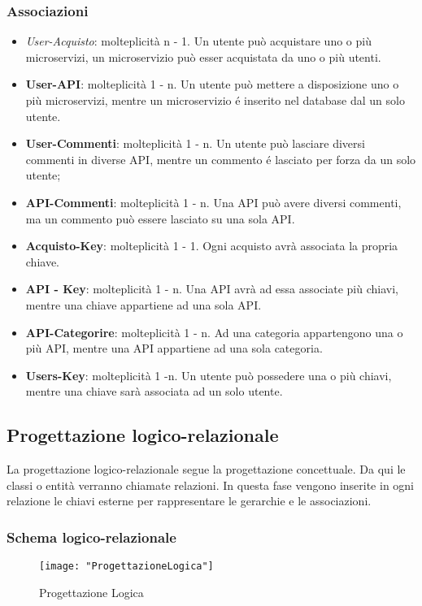 {{		\subsubsection{Associazioni}
		\begin{itemize}
			\item\textit{User-Acquisto}: molteplicità n - 1. Un utente può acquistare uno o più microservizi, un microservizio può esser acquistata da uno o più utenti.
			\item\textbf{User-API}: molteplicità 1 - n. Un utente può mettere a disposizione uno o più microservizi, mentre un microservizio é inserito nel database dal un solo utente.
			\item\textbf{User-Commenti}: molteplicità 1 - n. Un utente può lasciare diversi commenti in diverse API, mentre un commento é lasciato per forza da un solo utente;
			\item\textbf{API-Commenti}: molteplicità 1 - n. Una API può avere diversi commenti, ma un commento può essere lasciato su una sola API.	
			\item\textbf{Acquisto-Key}: molteplicità 1 - 1. Ogni acquisto avrà associata la propria chiave. 
			\item\textbf{API - Key}: molteplicità 1 - n. Una API avrà ad essa associate più chiavi, mentre una chiave appartiene ad una sola API.
			\item\textbf{API-Categorire}: molteplicità 1 - n. Ad una categoria appartengono una o più API, mentre una API appartiene ad una sola categoria.
			\item\textbf{Users-Key}: molteplicità 1 -n. Un utente può possedere una o più chiavi, mentre una chiave sarà associata ad un solo utente.
		\end{itemize}				

	}
	\subsection{Progettazione logico-relazionale}{
		La progettazione logico-relazionale segue la progettazione concettuale. Da qui le classi o entità verranno chiamate relazioni. In questa fase vengono inserite in ogni relazione le chiavi esterne per rappresentare le gerarchie e le associazioni.
		\subsubsection{Schema logico-relazionale}
		\begin{figure}[ht]
			\centering
			\texttt{[image: "ProgettazioneLogica"]}
			\caption{Progettazione Logica}
			\label{Fig. Progettazione Logica}
		\end{figure}
}}
